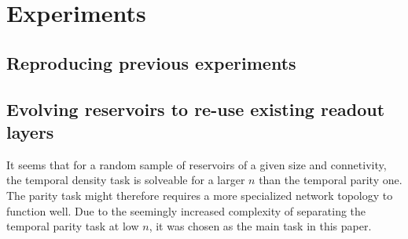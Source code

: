 \section{Experiments}

\subsection{Reproducing previous experiments}

\subsection{Evolving reservoirs to re-use existing readout layers}


It seems that for a random sample of reservoirs of a given size and connetivity,
the temporal density task is solveable for a larger $ n $ than the temporal parity one.
The parity task might therefore requires a more specialized network topology to function well.
Due to the seemingly increased complexity of separating the temporal parity task at low $ n $,
it was chosen as the main task in this paper.

